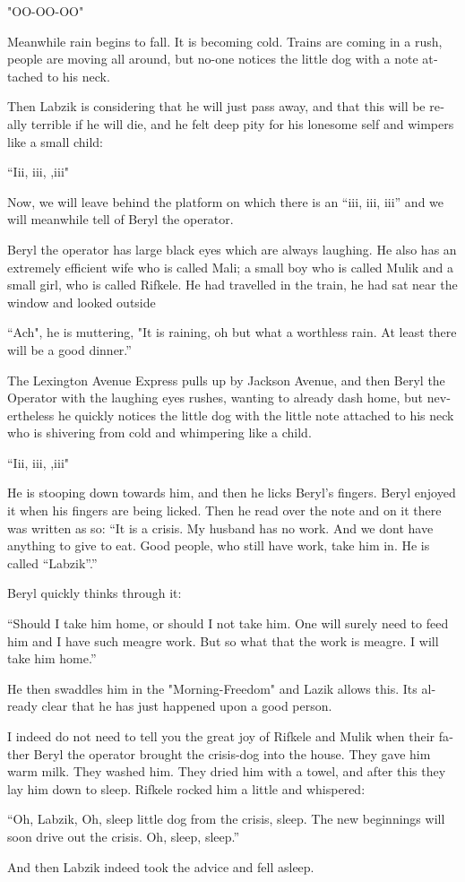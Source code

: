 \documentclass{memoir}
\begin{document}
\begin{pairs}
\begin{Leftside}
\begin{english}
"OO-OO-OO"

Meanwhile rain begins to fall. It is becoming cold. Trains are coming
in a rush, people are moving all around, but no-one notices the little
dog with a note attached to his neck.

Then Labzik is considering that he will just pass away, and that this will be
really terrible if he will die, and he felt deep pity for his lonesome self and
wimpers like a small child: 

``Iii, iii, ,iii"

Now, we will leave behind the platform on which there
is an ``iii, iii, iii'' and we will meanwhile tell of Beryl the operator.

Beryl the operator has large black eyes which are always laughing. He 
also has an extremely efficient wife who is called Mali; a small boy who is called 
Mulik and a small girl, who is called Rifkele. He had travelled in the train, he had
sat near the window and looked outside

``Ach", he is muttering, "It is raining, oh but what a worthless rain. At least there will
be a good dinner.''

The Lexington Avenue Express pulls up by Jackson Avenue, and then Beryl the Operator with the 
laughing eyes rushes, wanting to already dash home, but nevertheless he quickly notices the
little dog with the little note attached to his neck who is shivering from cold and whimpering like 
a child. 

``Iii, iii, ,iii"

He is stooping down towards him, and then he licks Beryl's fingers. Beryl enjoyed it when
his fingers are being licked. Then he read over the note and on it there was written as so:
``It is a crisis. My husband has no work. And we dont have anything to give to eat. Good people,
who still have work, take him in. He is called ``Labzik''.''

Beryl quickly thinks through it:

``Should I take him home, or should I not take him. One will surely need to feed him
and I have such meagre work. But so what that the work is meagre. I will take him home.''

He then swaddles him in the "Morning-Freedom" and Lazik allows this. Its already clear that he has
just happened upon a good person.

I indeed do not need to tell you the great joy of Rifkele and Mulik when their father Beryl the operator
brought the crisis-dog into the house. They gave him warm milk. They washed him. They dried him with
a towel, and after this they lay him down to sleep. Rifkele rocked him a little and whispered:

``Oh, Labzik, Oh, sleep little dog from the crisis, sleep. The new beginnings will soon drive out the crisis.
Oh, sleep, sleep.''

And then Labzik indeed took the advice and fell asleep.

\endnumbering
\end{english}
\end{Leftside}

\end{pairs}
\Columns
\end{document}
